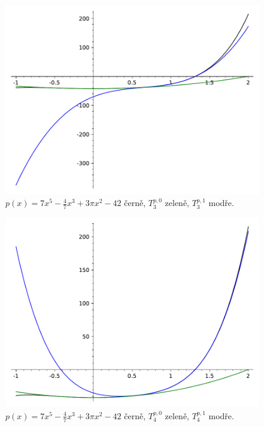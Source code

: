 \begin{enumerate}
{			\begin{figure}[H]
				\centering
				\includegraphics{cviceni_10/fig/taylor_pol_3.pdf}
				\caption{$p(x) = 7x^5 - \frac{4}{7} x^3 + 3\pi x^2 - 42$ černě, $T_3^{p, 0}$ zeleně, $T_3^{p, 1}$ modře.}
				\label{fig:taylor_3_pol}
			\end{figure}

			\begin{figure}[H]
				\centering
				\includegraphics{cviceni_10/fig/taylor_pol_4.pdf}
				\caption{$p(x) = 7x^5 - \frac{4}{7} x^3 + 3\pi x^2 - 42$ černě, $T_4^{p, 0}$ zeleně, $T_4^{p, 1}$ modře.}
				\label{fig:taylor_4_pol}
			\end{figure}

}
\end{enumerate}
